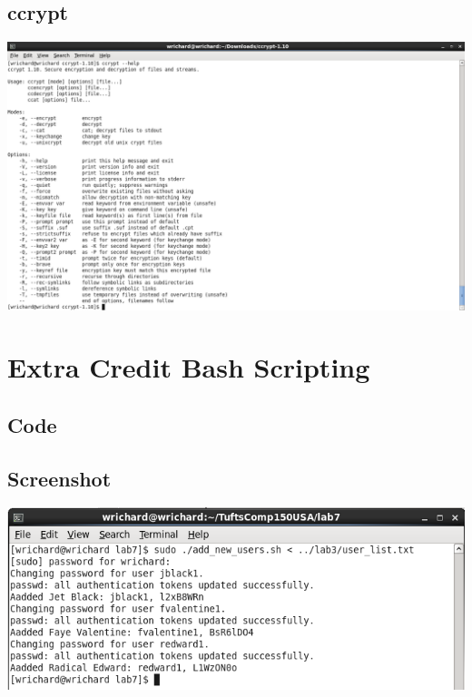 \documentclass[a4paper,10pt]{article}
\begin{document}
\subsection{ccrypt}
  \begin{center}
  \includegraphics[width=\linewidth]{./ccrypt.png}
  \end{center}

\section{Extra Credit Bash Scripting}
\subsection{Code}


\subsection{Screenshot}	
  \begin{center}
  \includegraphics[width=\linewidth]{./extra_credit.png}
  \end{center}
\end{document}
